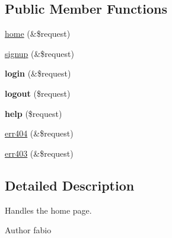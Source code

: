 \subsection*{Public Member Functions}
\begin{DoxyCompactItemize}
\item 
\hyperlink{classBasePageController_af9e63d62a5b86ea45c733a80abc58715}{home} (\&\$request)
\item 
\hyperlink{classBasePageController_a26864cbbdf6ced03397b1960f160b0eb}{signup} (\&\$request)
\item 
\hypertarget{classBasePageController_afce6b70e28e6c5086231443dd8255688}{{\bfseries login} (\&\$request)}\label{classBasePageController_afce6b70e28e6c5086231443dd8255688}

\item 
\hypertarget{classBasePageController_afc95ea5d827f2d3231c4dccacd9cf319}{{\bfseries logout} (\$request)}\label{classBasePageController_afc95ea5d827f2d3231c4dccacd9cf319}

\item 
\hypertarget{classBasePageController_a62656a3ea9f23250caeebd4076fb84da}{{\bfseries help} (\$request)}\label{classBasePageController_a62656a3ea9f23250caeebd4076fb84da}

\item 
\hyperlink{classBasePageController_a0442c7e815c3940f05f007be6549833c}{err404} (\&\$request)
\item 
\hyperlink{classBasePageController_a984b448e25573a6de434b03e9f0c2795}{err403} (\&\$request)
\end{DoxyCompactItemize}


\subsection{Detailed Description}
Handles the home page.

\begin{DoxyAuthor}{Author}
fabio 
\end{DoxyAuthor}


